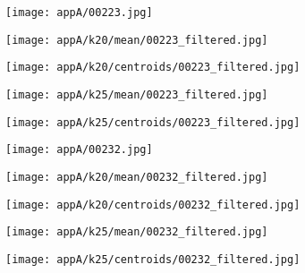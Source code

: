 \documentclass[draft,final]{vutinfth} %
\begin{document}
\begin{appendices}
\begin{figure}[h]
\centering
  \begin{subfigure}[t]{0.19\columnwidth}
    \centering
    \texttt{[image: appA/00223.jpg]}
  \end{subfigure}
  \begin{subfigure}[t]{0.19\columnwidth}
    \centering
    \texttt{[image: appA/k20/mean/00223\_filtered.jpg]}
  \end{subfigure}
  \begin{subfigure}[t]{0.19\columnwidth}
    \centering
    \texttt{[image: appA/k20/centroids/00223\_filtered.jpg]}
  \end{subfigure}
  \begin{subfigure}[t]{0.19\columnwidth}
    \centering
    \texttt{[image: appA/k25/mean/00223\_filtered.jpg]}
  \end{subfigure}
  \begin{subfigure}[t]{0.19\columnwidth}
    \centering
    \texttt{[image: appA/k25/centroids/00223\_filtered.jpg]}
  \end{subfigure}
\caption{}
 \label{appA:223}
\end{figure}  

\begin{figure}[h]
\centering
  \begin{subfigure}[t]{0.19\columnwidth}
    \centering
    \texttt{[image: appA/00232.jpg]}
  \end{subfigure}
  \begin{subfigure}[t]{0.19\columnwidth}
    \centering
    \texttt{[image: appA/k20/mean/00232\_filtered.jpg]}
  \end{subfigure}
  \begin{subfigure}[t]{0.19\columnwidth}
    \centering
    \texttt{[image: appA/k20/centroids/00232\_filtered.jpg]}
  \end{subfigure}
  \begin{subfigure}[t]{0.19\columnwidth}
    \centering
    \texttt{[image: appA/k25/mean/00232\_filtered.jpg]}
  \end{subfigure}
  \begin{subfigure}[t]{0.19\columnwidth}
    \centering
    \texttt{[image: appA/k25/centroids/00232\_filtered.jpg]}
  \end{subfigure}
\caption{}
\label{appA:232}
\end{figure}  


\end{appendices}
\end{document}
